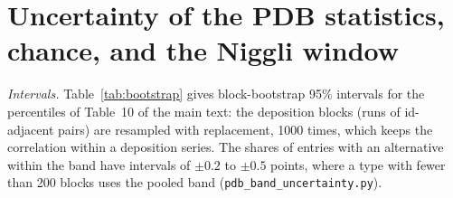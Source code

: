 \documentclass[preprint,pdf]{iucr}          %
\begin{document}
\section{Uncertainty of the PDB statistics, chance, and the Niggli window}\label{si:pdbstats}

\emph{Intervals.} Table~\ref{tab:bootstrap} gives block-bootstrap 95\% intervals for the percentiles of Table~10 of the main text: the deposition blocks (runs of id-adjacent pairs) are resampled with replacement, 1000 times, which keeps the correlation within a deposition series. The shares of entries with an alternative within the band have intervals of $\pm0.2$ to $\pm0.5$ points, where a type with fewer than 200 blocks uses the pooled band (\texttt{pdb\_band\_uncertainty.py}).
\end{document}
